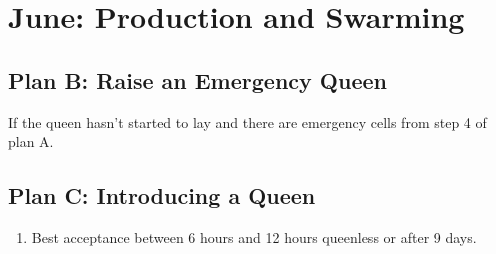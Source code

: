 \section{June: Production and Swarming}

\subsection{Plan B: Raise an Emergency Queen}

If the queen hasn't started to lay and there are emergency cells from step 4 of plan A.



\subsection{Plan C: Introducing a Queen}
 
 \begin{enumerate}
	\item{Best acceptance between 6 hours and 12 hours queenless or after 9 days.}
\end{enumerate}